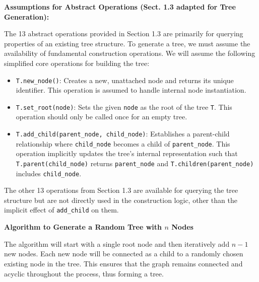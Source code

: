 \documentclass{article}
\begin{document}
\textbf{Assumptions for Abstract Operations (Sect. 1.3 adapted for Tree Generation):}

The 13 abstract operations provided in Section 1.3 are primarily for querying properties of an existing tree structure. To generate a tree, we must assume the availability of fundamental construction operations. We will assume the following simplified core operations for building the tree:

\begin{itemize}
    \item \texttt{T.new\_node()}: Creates a new, unattached node and returns its unique identifier. This operation is assumed to handle internal node instantiation.
    \item \texttt{T.set\_root(node)}: Sets the given \texttt{node} as the root of the tree \texttt{T}. This operation should only be called once for an empty tree.
    \item \texttt{T.add\_child(parent\_node, child\_node)}: Establishes a parent-child relationship where \texttt{child\_node} becomes a child of \texttt{parent\_node}. This operation implicitly updates the tree's internal representation such that \texttt{T.parent(child\_node)} returns \texttt{parent\_node} and \texttt{T.children(parent\_node)} includes \texttt{child\_node}.
\end{itemize}
The other 13 operations from Section 1.3 are available for querying the tree structure but are not directly used in the construction logic, other than the implicit effect of \texttt{add\_child} on them.

\textbf{Algorithm to Generate a Random Tree with $n$ Nodes}

The algorithm will start with a single root node and then iteratively add $n-1$ new nodes. Each new node will be connected as a child to a randomly chosen existing node in the tree. This ensures that the graph remains connected and acyclic throughout the process, thus forming a tree.
\end{document}
